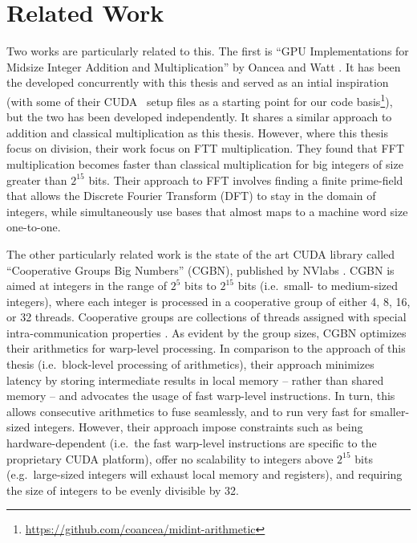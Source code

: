 \section{Related Work}
\label{sec:rel}

Two works are particularly related to this. The first is ``GPU Implementations
for Midsize Integer Addition and Multiplication'' by Oancea and Watt
\cite{oancea2024gpu}. It has been the developed concurrently with this thesis
and served as an intial inspiration (with some of their CUDA \cpp\ setup files
as a starting point for our code
basis\footnote{\url{https://github.com/coancea/midint-arithmetic}}), but the two
has been developed independently. It shares a similar approach to addition and
classical multiplication as this thesis. However, where this thesis focus on
division, their work focus on FTT multiplication. They found that FFT
multiplication becomes faster than classical multiplication for big integers of
size greater than $2^{15}$ bits. Their approach to FFT involves finding a finite
prime-field that allows the Discrete Fourier Transform (DFT) to stay in the
domain of integers, while simultaneously use bases that almost maps to a machine
word size one-to-one.

The other particularly related work is the state of the art CUDA library called
``Cooperative Groups Big Numbers'' (CGBN), published by NVlabs \cite{CGBN}. CGBN
is aimed at integers in the range of $2^5$ bits to $2^{15}$ bits (i.e.\ small-
to medium-sized integers), where each integer is processed in a cooperative
group of either 4, 8, 16, or 32 threads. Cooperative groups are collections of
threads assigned with special intra-communication properties
\cite{cudaguide}. As evident by the group sizes, CGBN optimizes their
arithmetics for warp-level processing.  In comparison to the approach of this
thesis (i.e.\ block-level processing of arithmetics), their approach minimizes
latency by storing intermediate results in local memory -- rather than shared
memory -- and advocates the usage of fast warp-level instructions. In turn, this
allows consecutive arithmetics to fuse seamlessly, and to run very fast for
smaller-sized integers. However, their approach impose constraints such as being
hardware-dependent (i.e.\ the fast warp-level instructions are specific to the
proprietary CUDA platform), offer no scalability to integers above $2^{15}$ bits
(e.g.\ large-sized integers will exhaust local memory and registers), and
requiring the size of integers to be evenly divisible by 32.


